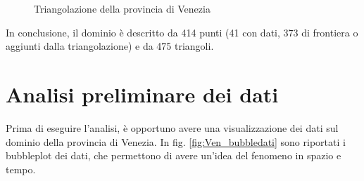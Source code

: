 \documentclass[a4paper,11pt,twoside,openright]{book}							%
\begin{document}
\begin{figure}[!t]
\centering
{}
\caption{Triangolazione della provincia di Venezia}
\label{fig:Ven_triang}
\end{figure}

In conclusione, il dominio è descritto da 414 punti (41 con dati, 373 di frontiera o aggiunti dalla triangolazione) e da 475 triangoli. 

\section{Analisi preliminare dei dati}
Prima di eseguire l'analisi, è opportuno avere una visualizzazione dei dati sul dominio della provincia di Venezia. In fig. \ref{fig:Ven_bubbledati} sono riportati i bubbleplot dei dati, che permettono di avere un'idea del fenomeno in spazio e tempo.
\end{document}
